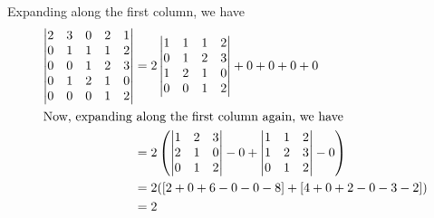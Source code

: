 Expanding along the first column, we have
\begin{align*}
\begin{vmatrix} 
2 & 3 & 0 & 2 & 1\\ 
0 & 1 & 1 & 1 & 2\\
0 & 0 & 1 & 2 & 3\\
0 & 1 & 2 & 1 &0\\
0 & 0 & 0 & 1 & 2
\end{vmatrix}
&= 
2 \begin{vmatrix} 
1 & 1 & 1 & 2\\ 
0 & 1 & 2 & 3\\ 
1 & 2 & 1 & 0\\
0 & 0 & 1 & 2 
\end{vmatrix} 
+ 0 + 0 + 0 + 0\\
\intertext{Now, expanding along the first column again, we have}
&= 2\left( 
\begin{vmatrix}  
1 & 2 & 3\\ 
2 & 1 & 0\\ 
0 & 1 & 2
\end{vmatrix} - 0  + 
\begin{vmatrix} 
1 & 1 & 2\\
1 & 2 & 3\\
0 & 1 & 2 
\end{vmatrix} - 0 
\right)\\
&= 2([2 +0 + 6 - 0 - 0 - 8] + [4 + 0 + 2 - 0 - 3 - 2])\\
&= 2
\end{align*}